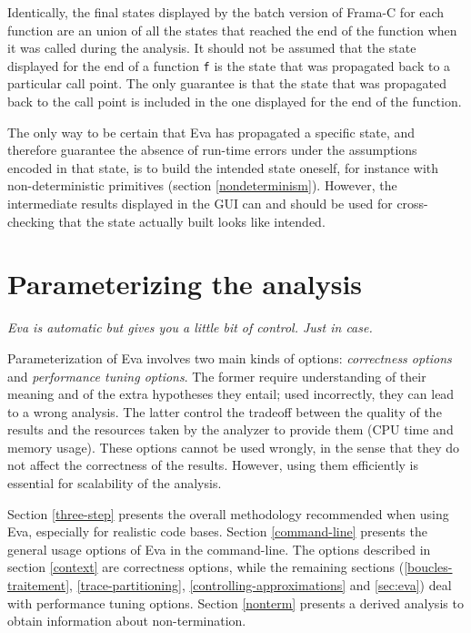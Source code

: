 \documentclass[web]{frama-c-book}
\newcommand{\Eva}{\textsf{Eva}}
\begin{document}
Identically, the final states displayed by the batch version of
Frama-C for each function are an union of all
the states that reached the end of the function when it was called
during the analysis.  It should not be assumed that the state
displayed for the end of a function \verb|f| is the state that was
propagated back to a particular call point. The only guarantee is
that the state that was propagated back to the call point is included
in the one displayed for the end of the function.

The only way to be certain that \Eva{} has propagated 
a specific state, and therefore guarantee the absence of run-time
errors under the assumptions encoded in that state, is to build
the intended state oneself, for instance with non-deterministic
primitives (section \ref{nondeterminism}). 
However, the intermediate results displayed in
the GUI can and should be used for
cross-checking that the state actually built
looks like intended.


\chapter{Parameterizing the analysis}\label{parameterizing}
\vspace{2cm}

{\em \Eva{} is automatic but gives you a little bit of control.
Just in case.}

\vspace{2cm}

Parameterization of \Eva{} involves two main kinds of options:
{\em correctness options} and {\em performance tuning options}.
The former require understanding of their meaning and of the extra hypotheses
they entail; used incorrectly, they can lead to a wrong analysis.
The latter control the tradeoff between the quality of the results and the
resources taken by the analyzer to provide them (CPU time and memory usage).
These options cannot be used wrongly, in the sense that they do not affect the
correctness of the results. However, using them efficiently is essential for
scalability of the analysis.

Section \ref{three-step} presents the overall methodology recommended when
using \Eva{}, especially for realistic code bases.
Section \ref{command-line} presents the general usage options of \Eva{} in the
command-line.
The options described in section \ref{context} are correctness options,
while the remaining sections (\ref{boucles-traitement},
\ref{trace-partitioning},
\ref{controlling-approximations} and \ref{sec:eva}) deal with performance
tuning options. Section \ref{nonterm} presents a derived analysis to
obtain information about non-termination.
\end{document}
